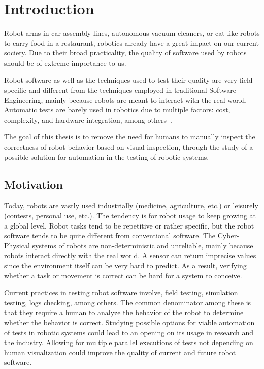 \chapter{Introduction}
\label{chap:introduction}

Robot arms in car assembly lines, autonomous vacuum cleaners, or cat-like robots to carry food in a restaurant, robotics already have a great impact on our current society. Due to their broad practicality, the quality of software used by robots should be of extreme importance to us.

Robot software as well as the techniques used to test their quality are very field-specific and different from the techniques employed in traditional Software Engineering, mainly because robots are meant to interact with the real world. Automatic tests are barely used in robotics due to multiple factors: cost, complexity, and hardware integration, among others~\cite{TestRob}.

The goal of this thesis is to remove the need for humans to manually inspect the correctness of robot behavior based on visual inspection, through the study of a possible solution for automation in the testing of robotic systems.


\section{Motivation}
\label{sec:motivation}

Today, robots are vastly used industrially (medicine, agriculture, etc.) or leisurely (contests, personal use, etc.). The tendency is for robot usage to keep growing at a global level. Robot tasks tend to be repetitive or rather specific, but the robot software tends to be quite different from conventional software. The Cyber-Physical systems of robots are non-deterministic and unreliable, mainly because robots interact directly with the real world. A sensor can return imprecise values since the environment itself can be very hard to predict. As a result, verifying whether a task or movement is correct can be hard for a system to conceive.

Current practices in testing robot software involve, field testing, simulation testing, logs checking, among others. The common denominator among these is that they require a human to analyze the behavior of the robot to determine whether the behavior is correct. Studying possible options for viable automation of tests in robotic systems could lead to an opening on its usage in research and the industry. Allowing for multiple parallel executions of tests not depending on human visualization could improve the quality of current and future robot software.

